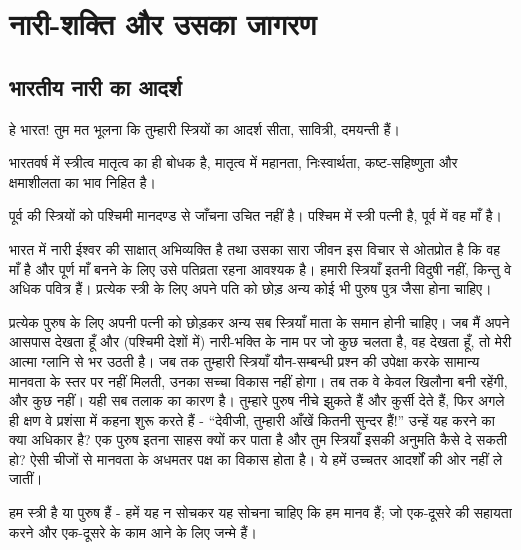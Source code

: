 
\chapter{नारी-शक्ति और उसका जागरण }

\indentsecionsintoc



\section*{भारतीय नारी का आदर्श}


हे भारत! तुम मत भूलना कि तुम्हारी स्त्रियों का आदर्श सीता, सावित्री, दमयन्ती हैं। 

भारतवर्ष में स्त्रीत्व मातृत्व का ही बोधक है, मातृत्व में महानता, निःस्वार्थता, कष्ट-सहिष्णुता और क्षमाशीलता का भाव निहित है। 

पूर्व की स्त्रियों को पश्चिमी मानदण्ड से जाँचना उचित नहीं है। पश्चिम में स्त्री पत्नी है, पूर्व में वह माँ है। 

भारत में नारी ईश्वर की साक्षात् अभिव्यक्ति है तथा उसका सारा जीवन इस विचार से ओतप्रोत है कि वह माँ है और पूर्ण माँ बनने के लिए उसे पतिव्रता रहना आवश्यक है। हमारी स्त्रियाँ इतनी विदुषी नहीं, किन्तु वे अधिक पवित्र हैं। प्रत्येक स्त्री के लिए अपने पति को छोड़ अन्य कोई भी पुरुष पुत्र जैसा होना चाहिए। 

प्रत्येक पुरुष के लिए अपनी पत्नी को छोड़कर अन्य सब स्त्रियाँ माता के समान होनी चाहिए। जब मैं अपने आसपास देखता हूँ और (पश्चिमी देशों में) नारी-भक्ति के नाम पर जो कुछ चलता है, वह देखता हूँ, तो मेरी आत्मा ग्लानि से भर उठती है। जब तक तुम्हारी स्त्रियाँ यौन-सम्बन्धी प्रश्न की उपेक्षा करके सामान्य मानवता के स्तर पर नहीं मिलती, उनका सच्चा विकास नहीं होगा। तब तक वे केवल खिलौना बनी रहेंगी, और कुछ नहीं। यही सब तलाक का कारण है। तुम्हारे पुरुष नीचे झुकते हैं और कुर्सी देते हैं, फिर अगले ही क्षण वे प्रशंसा में कहना शुरू करते हैं - “देवीजी, तुम्हारी आँखें कितनी सुन्दर हैं!” उन्हें यह करने का क्या अधिकार है? एक पुरुष इतना साहस क्यों कर पाता है और तुम स्त्रियाँ इसकी अनुमति कैसे दे सकती हो? ऐसी चीजों से मानवता के अधमतर पक्ष का विकास होता है। ये हमें उच्चतर आदर्शों की ओर नहीं ले जातीं। 

हम स्त्री है या पुरुष हैं - हमें यह न सोचकर यह सोचना चाहिए कि हम मानव हैं; जो एक-दूसरे की सहायता करने और एक-दूसरे के काम आने के लिए जन्मे हैं।\endnotemark[\theendnote]


